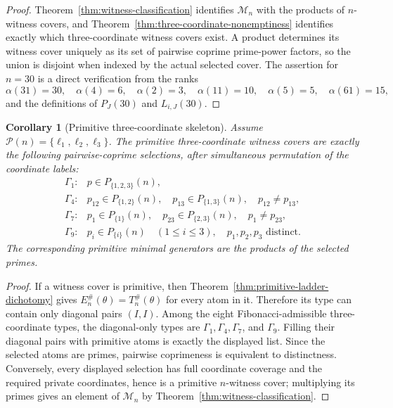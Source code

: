 \documentclass[11pt,letterpaper]{article}
\numberwithin{equation}{section}
\theoremstyle{plain}
\newtheorem{corollary}[theorem]{Corollary}
\theoremstyle{definition}
\theoremstyle{remark}
\begin{document}
\begin{proof}
Theorem~\ref{thm:witness-classification} identifies \(\mathcal M_n\) with the
products of \(n\)-witness covers, and
Theorem~\ref{thm:three-coordinate-nonemptiness} identifies exactly which
three-coordinate witness covers exist. A product determines its witness cover
uniquely as its set of pairwise coprime prime-power factors, so the union is
disjoint when indexed by the actual selected cover. The assertion for \(n=30\)
is a direct verification from the ranks
\[
\alpha(31)=30,\quad \alpha(4)=6,\quad \alpha(2)=3,\quad
\alpha(11)=10,\quad \alpha(5)=5,\quad \alpha(61)=15,
\]
and the definitions of \(P_J(30)\) and \(L_{i,J}(30)\).
\end{proof}

\begin{corollary}[Primitive three-coordinate skeleton]
\label{cor:primitive-three-skeleton}
Assume \(\mathcal P(n)=\{\ell_1,\ell_2,\ell_3\}\). The primitive
three-coordinate witness covers are exactly the following pairwise-coprime
selections, after simultaneous permutation of the coordinate labels:
\[
\begin{array}{ll}
\Gamma_1: & p\in P_{\{1,2,3\}}(n),\\[1mm]
\Gamma_4: & p_{12}\in P_{\{1,2\}}(n),\quad
             p_{13}\in P_{\{1,3\}}(n),\quad
             p_{12}\ne p_{13},\\[1mm]
\Gamma_7: & p_1\in P_{\{1\}}(n),\quad
             p_{23}\in P_{\{2,3\}}(n),\quad
             p_1\ne p_{23},\\[1mm]
\Gamma_9: & p_i\in P_{\{i\}}(n)\quad(1\le i\le3),\quad
             p_1,p_2,p_3\text{ distinct}.
\end{array}
\]
The corresponding primitive minimal generators are the products of the selected
primes.
\end{corollary}

\begin{proof}
If a witness cover is primitive, then
Theorem~\ref{thm:primitive-ladder-dichotomy} gives
\(E_n^\#(\theta)=T_n^\#(\theta)\) for every atom in it. Therefore its type can
contain only diagonal pairs \((I,I)\). Among the eight Fibonacci-admissible
three-coordinate types, the diagonal-only types are
\(\Gamma_1,\Gamma_4,\Gamma_7\), and \(\Gamma_9\). Filling their diagonal pairs
with primitive atoms is exactly the displayed list. Since the selected atoms are
primes, pairwise coprimeness is equivalent to distinctness. Conversely, every
displayed selection has full coordinate coverage and the required private
coordinates, hence is a primitive \(n\)-witness cover; multiplying its primes
gives an element of \(\mathcal M_n\) by
Theorem~\ref{thm:witness-classification}.
\end{proof}
\end{document}
